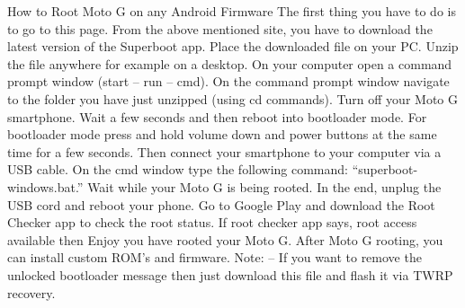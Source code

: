 How to Root Moto G on any Android Firmware
The first thing you have to do is to go to this page.
From the above mentioned site, you have to download the latest version of the Superboot app.
Place the downloaded file on your PC.
Unzip the file anywhere for example on a desktop.
On your computer open a command prompt window (start – run – cmd).
On the command prompt window navigate to the folder you have just unzipped (using cd commands).
Turn off your Moto G smartphone.
Wait a few seconds and then reboot into bootloader mode.
For bootloader mode press and hold volume down and power buttons at the same time for a few seconds.
Then connect your smartphone to your computer via a USB cable.
On the cmd window type the following command: “superboot-windows.bat.”
Wait while your Moto G is being rooted.
In the end, unplug the USB cord and reboot your phone.
Go to Google Play and download the Root Checker app to check the root status.
If root checker app says, root access available then Enjoy you have rooted your Moto G.
After Moto G rooting, you can install custom ROM’s and firmware.
Note: – If you want to remove the unlocked bootloader message then just download this file and flash it via TWRP recovery.

